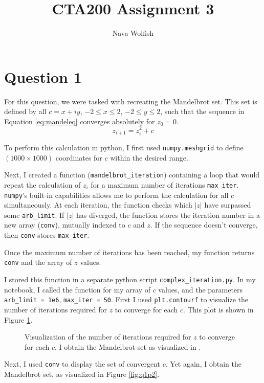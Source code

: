 \documentclass[linenumbers,trackchanges]{aastex7}
\begin{document}
\title{CTA200 Assignment 3}


\author[]{Nava Wolfish}


\section{Question 1} 
For this question, we were tasked with recreating the Mandelbrot set. This set is defined by all $c = x + iy$, $-2 \leq x \leq 2$, $-2 \leq y \leq 2$, such that the sequence in Equation \ref{eq:mandeleq} converges absolutely for $z_0 = 0$. 
\begin{equation}\label{eq:mandeleq}
     z_{i+1} = z_i^2 + c
\end{equation}

To perform this calculation in python, I first used \verb|numpy.meshgrid| to define $(1000 \times 1000)$ coordinates for $c$ within the desired range.

Next, I created a function (\verb|mandelbrot_iteration|) containing a loop that would repeat the calculation of $z_i$ for a maximum number of iterations \verb|max_iter|. \verb|numpy|'s built-in capabilities allows me to perform the calculation for all $c$ simultaneously. At each iteration, the function checks which $|z|$ have surpassed some \verb|arb_limit|. If $|z|$ has diverged, the function stores the iteration number in a new array (\verb|conv|), mutually indexed to $c$ and $z$. If the sequence doesn't converge, then \verb|conv| stores \verb|max_iter|. 

Once the maximum number of iterations has been reached, my function returns \verb|conv| and the array of $z$ values. 

I stored this function in a separate python script \verb|complex_iteration.py|. In my notebook, I called the function for my array of $c$ values, and the parameters \verb|arb_limit = 1e6|, \verb|max_iter = 50|. First I used \verb|plt.contourf| to visualize the number of iterations required for $z$ to converge for each $c$. This plot is shown in Figure \ref{fig:q1p1}.

\begin{figure}[h!]
\caption{Visualization of the number of iterations required for $z$ to converge for each $c$. I obtain the Mandelbrot set as visualized in \citet{avalos-bock}.}
\label{fig:q1p1}
\end{figure}

Next, I used \verb|conv| to display the set of convergent $c$. Yet again, I obtain the Mandelbrot set, as visualized in Figure \ref{fig:q1p2}. 
\end{document}
